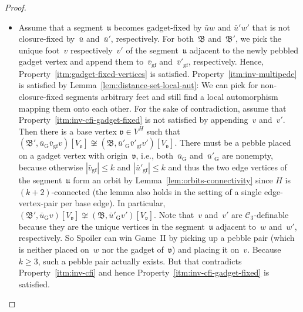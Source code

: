 \documentclass[]{lmcs}
\newcommand{\iso}{\cong}
\newcommand{\tup}[1]{\bar{#1}}
\newcommand{\vertA}{u}
\newcommand{\vertB}{v}
\newcommand{\vertC}{w}
\newcommand{\StructB}{\mathfrak{B}}
\newcommand{\Ck}[1]{\mathcal{C}_{#1}}
\newcommand{\bVertA}{\mathfrak{u}}
\newcommand{\bVertB}{\mathfrak{v}}
\newcommand{\gadgetrestrict}[1]{#1_{\text{G}}}
\newcommand{\gadgetfixed}[1]{#1_{\text{gf}}}
\begin{document}
\begin{proof}
\begin{enumerate}[label=(\alph*)]
\begin{itemize}
		\item Assume that a segment~$\bVertA$ becomes gadget-fixed by $\tup{\vertA}\vertC$ and $\tup{\vertA}'\vertC'$
		that is not closure-fixed by~$\tup{\vertA}$ and~$\tup{\vertA}'$, respectively.
		For both~$\StructB$ and~$\StructB'$,
		we pick the unique foot~$\vertB$ respectively~$\vertB'$
		of the segment~$\bVertA$
		adjacent to the newly pebbled gadget vertex
		and append them
		to~$\gadgetfixed{\tup{\vertB}}$ and~$\gadgetfixed{\tup{\vertB}'}$, respectively.
		Hence, Property~\ref{itm:gadget-fixed-vertices} is satisfied.
		Property~\ref{itm:inv-multipede} is satisfied by Lemma~\ref{lem:distance-set-local-aut}:
		We can pick for non-closure-fixed segments arbitrary feet
		and still find a local automorphism mapping them onto each other.
		For the sake of contradiction,
		assume that Property~\ref{itm:inv-cfi-gadget-fixed} is not satisfied
		by appending~$\vertB$ and~$\vertB'$.
		Then there is a base vertex $\bVertB \in V^H$
		such that $(\StructB', \gadgetrestrict{\tup{\vertA}}\gadgetfixed{\tup{\vertB}}\vertB)[V_\bVertB] \not\iso (\StructB, \gadgetrestrict{\tup{\vertA}'}\gadgetfixed{\tup{\vertB}'}\vertB')[V_\bVertB]$.
		There must be a pebble placed on a gadget vertex with origin~$\bVertB$,
		i.e., both~$\gadgetrestrict{\tup{\vertA}}$ and~$\gadgetrestrict{\tup{\vertA}'}$
		are nonempty,
		because otherwise $|\gadgetfixed{\tup{\vertB}}|\leq k$ and $|\gadgetfixed{\tup{\vertA}'}| \leq k$
		and thus the two edge vertices of the segment~$\bVertA$ form an orbit by Lemma~\ref{lem:orbits-connectivity} since $H$ is $(k+2)$-connected
		(the lemma also holds in the setting of a single edge-vertex-pair per base edge).
		In particular,
		$(\StructB', \gadgetrestrict{\tup{\vertA}}\vertB)[V_\bVertB] \not\iso (\StructB, \gadgetrestrict{\tup{\vertA}'}\vertB')[V_\bVertB]$.
		Note that~$\vertB$ and~$\vertB'$ are $\Ck{3}$-definable
		because they are the unique vertices in the segment~$\bVertA$
		adjacent to~$\vertC$ and~$\vertC'$, respectively.
		So Spoiler can win Game~II
		by picking up a pebble pair (which is neither placed on~$\vertC$ nor the gadget of~$\bVertB$)
		and placing it on~$\vertB$.
		Because $k \geq 3$, such a pebble pair actually exists.
		But that contradicts Property~\ref{itm:inv-cfi}
		and hence Property~\ref{itm:inv-cfi-gadget-fixed} is satisfied.
		\end{itemize}
		
	
		

\end{enumerate}
\end{proof}
\end{document}
